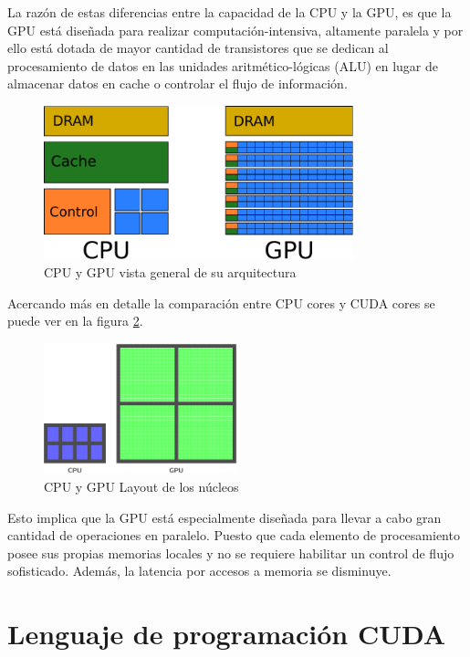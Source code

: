 La razón de estas diferencias entre la capacidad de la CPU y la GPU, es que la
GPU está diseñada para realizar computación-intensiva, altamente paralela y por
ello está dotada de mayor cantidad de transistores que se dedican al
procesamiento de datos en las unidades aritmético-lógicas (ALU) en lugar de
almacenar datos en cache o controlar el flujo de información.

\begin{figure}[h]
    \centering
    \includegraphics[width=0.8\textwidth]{images/cpu_gpu_arch.pdf}
    \caption{CPU y GPU vista general de su arquitectura}
    \label{fig:cpu_gpu_arch}
\end{figure}

Acercando más en detalle la comparación entre CPU cores y CUDA cores se puede
ver en la figura \ref{fig:cpu_gpu}.

\begin{figure}[h]
    \centering
    \includegraphics[width=0.5\textwidth]{images/cpu_gpu.pdf}
    \caption{CPU y GPU Layout de los núcleos}
    \label{fig:cpu_gpu}
\end{figure}

Esto implica que la GPU está especialmente diseñada para llevar a cabo gran
cantidad de operaciones en paralelo. Puesto que cada elemento de procesamiento
posee sus propias memorias locales y no se requiere habilitar un control de
flujo sofisticado. Además, la latencia por accesos a memoria se disminuye.

\newpage
\section{Lenguaje de programación CUDA}

